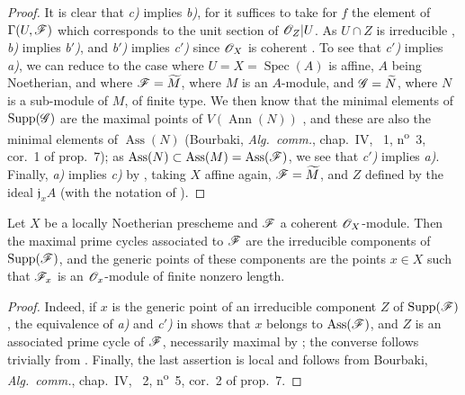 \begin{proof}
It is clear that \emph{c)} implies \emph{b)}, for it suffices to take for $f$ the element of $\Gamma(U,\mathscr{F})$ which corresponds to the unit section of $\mathscr{O}_Z|U$.
As $U\cap Z$ is irreducible , \emph{b)} implies \emph{b$'$)}, and \emph{b$'$)} implies \emph{c$'$)} since $\mathscr{O}_X$ is coherent .
To see that \emph{c$'$)} implies \emph{a)}, we can reduce to the case where $U=X=\operatorname{Spec}(A)$ is affine, $A$ being Noetherian, and where $\mathscr{F}=\widetilde{M}$, where $M$ is an $A$-module, and $\mathscr{G}=\widetilde{N}$, where $N$ is a sub-module of $M$, of finite type.
We then know that the minimal elements of $\operatorname{Supp}(\mathscr{G})$ are the maximal points of $V(\operatorname{Ann}(N))$ , and these are also the minimal elements of $\operatorname{Ass}(N)$ (Bourbaki, \emph{Alg.\ comm.}, chap.~IV, \textsection~1, n\textsuperscript{o}~3, cor.~1 of prop.~7);
as $\operatorname{Ass}(N)\subset\operatorname{Ass}(M)=\operatorname{Ass}(\mathscr{F})$, we see that \emph{c$'$)} implies \emph{a)}.
Finally, \emph{a)} implies \emph{c)} by , taking $X$ affine again, $\mathscr{F}=\widetilde{M}$, and $Z$ defined by the ideal $\mathfrak{j}_xA$ (with the notation of ).
\end{proof}

\begin{corollary}[3.1.4]
\label{IV.3.1.4}
Let $X$ be a locally Noetherian prescheme and $\mathscr{F}$ a coherent $\mathscr{O}_X$-module.
Then the maximal prime cycles associated to $\mathscr{F}$ are the irreducible components of $\operatorname{Supp}(\mathscr{F})$, and the generic points of these components are the points $x\in X$ such that $\mathscr{F}_x$ is an $\mathscr{O}_x$-module of finite nonzero length.
\end{corollary}

\begin{proof}
Indeed, if $x$ is the generic point of an irreducible component $Z$ of $\operatorname{Supp}(\mathscr{F})$, the equivalence of \emph{a)} and \emph{c$'$)} in  shows that $x$ belongs to $\operatorname{Ass}(\mathscr{F})$, and $Z$ is an associated prime cycle of $\mathscr{F}$, necessarily maximal by ; the converse follows trivially from . Finally, the last assertion is local and follows from Bourbaki, \emph{Alg.\ comm.}, chap.~IV, \textsection~2, n\textsuperscript{o}~5, cor.~2 of prop.~7.
\end{proof}

